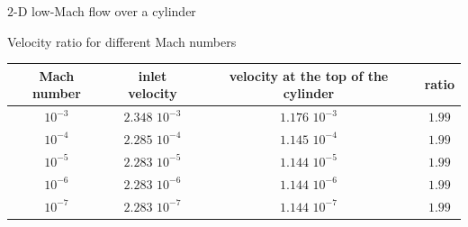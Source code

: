 \documentclass[xcolor=dvipsnames,10pt]{beamer}
\begin{document}
\begin{frame}{$2$-D low-Mach flow over a cylinder}
\begin{center}
Velocity ratio for different Mach numbers
\end{center}
\begin{table}[H]
\begin{center}
\begin{tabular}{|c|c|c|c|}
\hline
Mach number & inlet velocity & velocity at the top of the cylinder & ratio \\ \hline
$10^{-3}$ & $2.348$ $10^{-3}$ & $1.176$ $10^{-3}$& $1.99$  \\ \hline
$10^{-4}$ & $2.285$ $10^{-4}$ & $1.145$ $10^{-4}$& $1.99$  \\ \hline
$10^{-5}$ & $2.283$ $10^{-5}$ & $1.144$ $10^{-5}$ & $1.99$ \\ \hline
$10^{-6}$ & $2.283$ $10^{-6}$ & $1.144$ $10^{-6}$ & $1.99$ \\ \hline
$10^{-7}$ & $2.283$ $10^{-7}$ & $1.144$ $10^{-7}$ & $1.99$ \\ \hline
\end{tabular}
\end{center}
\nonumber
\end{table}
\end{frame}
\end{document}
